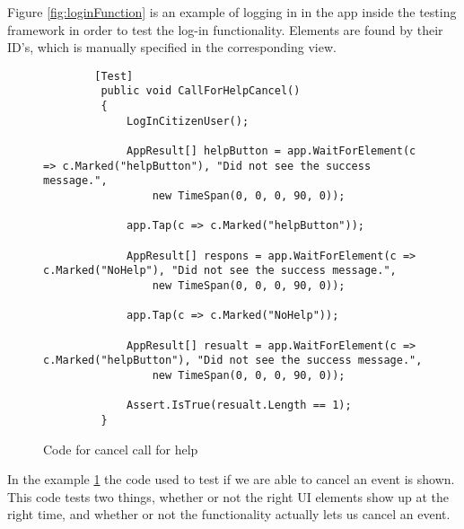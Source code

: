 Figure \ref{fig:loginFunction} is an example of logging in in the app inside the testing framework in order to test the log-in functionality. Elements are found by their ID's, which is manually specified in the corresponding view.

\begin{figure}[H]
    \centering
    \begin{lstlisting}
        [Test]
         public void CallForHelpCancel()
         {
             LogInCitizenUser();
 
             AppResult[] helpButton = app.WaitForElement(c => c.Marked("helpButton"), "Did not see the success message.",
                 new TimeSpan(0, 0, 0, 90, 0));
 
             app.Tap(c => c.Marked("helpButton"));
 
             AppResult[] respons = app.WaitForElement(c => c.Marked("NoHelp"), "Did not see the success message.",
                 new TimeSpan(0, 0, 0, 90, 0));
 
             app.Tap(c => c.Marked("NoHelp"));
 
             AppResult[] resualt = app.WaitForElement(c => c.Marked("helpButton"), "Did not see the success message.",
                 new TimeSpan(0, 0, 0, 90, 0));
 
             Assert.IsTrue(resualt.Length == 1);
         }
    \end{lstlisting}
    \caption{Code for cancel call for help}
    \label{fig:test:cancelHelp}
\end{figure}
In the example \ref{fig:test:cancelHelp} the code used to test if we are able to cancel an event is shown. This code tests two things, whether or not the right UI elements show up at the right time, and whether or not the functionality actually lets us cancel an event.
